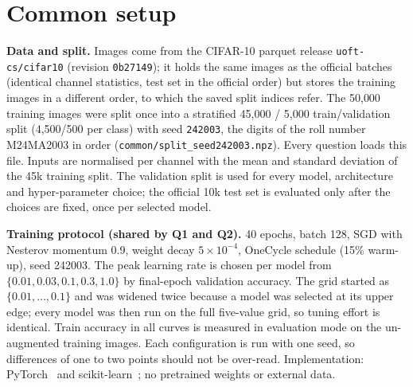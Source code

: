 \begin{abstract}
We study four questions on CIFAR-10~\cite{krizhevsky2009cifar} with controlled comparisons rather than
leaderboard numbers. A fully connected network fits the training set but generalises poorly; a CNN with the
same parameter count and training budget gains 32 test points, while four times more MLP parameters gain 1.4.
Training on partly random labels shows that the MLP learns transferable structure in the first few epochs
and memorises afterwards. A fixed pixel permutation leaves the MLP unchanged but costs the CNN most of its
advantage, and shuffling image patches separates local evidence from global layout. For autoencoders,
reconstruction error and class information only agree roughly, and denoising recovers part, not all, of what a
fixed classifier needs. Finally an SVM and a clustering of the same autoencoder code are compared class pair by
class pair. All numbers quoted as final results are test-set numbers obtained after every choice was fixed on
validation data.
\end{abstract}

\section{Common setup}
\label{sec:setup}
\textbf{Data and split.} Images come from the CIFAR-10 parquet release \texttt{uoft-cs/cifar10} (revision
\texttt{0b27149}); it holds the same images as the official batches (identical channel statistics, test set in
the official order) but stores the training images in a different order, to which the saved split indices
refer. The 50{,}000 training images were split once into a stratified 45{,}000 /
5{,}000 train/validation split (4{,}500/500 per class) with seed \texttt{242003}, the digits of the roll number
M24MA2003 in order (\texttt{common/split\_seed242003.npz}). Every question loads this file. Inputs are normalised
per channel with the mean and standard deviation of the 45k training split. The validation split is used for
every model, architecture and hyper-parameter choice; the official 10k test set is evaluated only after the
choices are fixed, once per selected model.

\textbf{Training protocol (shared by Q1 and Q2).} 40 epochs, batch 128, SGD with Nesterov momentum 0.9, weight
decay $5\!\times\!10^{-4}$, OneCycle schedule (15\% warm-up), seed 242003. The peak learning rate is chosen per
model from $\{0.01, 0.03, 0.1, 0.3, 1.0\}$ by final-epoch validation accuracy. The grid started as
$\{0.01,\dots,0.1\}$ and was widened twice because a model was selected at its upper edge; every model was then
run on the full five-value grid, so tuning effort is identical. Train accuracy in all curves is measured in
evaluation mode on the un-augmented training images. Each configuration is run with one seed, so differences of
one to two points should not be over-read. Implementation: PyTorch~\cite{paszke2019pytorch} and
scikit-learn~\cite{pedregosa2011scikit}; no pretrained weights or external data.

